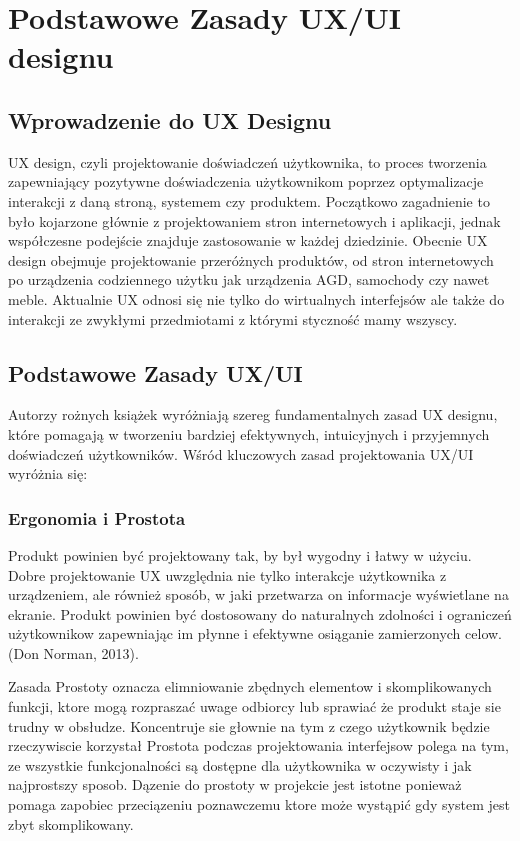 \chapter{Podstawowe Zasady UX/UI designu}

\section{Wprowadzenie do UX Designu}

 UX design, czyli projektowanie doświadczeń użytkownika, to proces tworzenia zapewniający pozytywne doświadczenia użytkownikom poprzez optymalizacje interakcji z daną stroną, systemem czy produktem. Początkowo zagadnienie to było kojarzone głównie z projektowaniem stron internetowych i aplikacji, jednak współczesne podejście znajduje zastosowanie w każdej dziedzinie. Obecnie UX design obejmuje projektowanie przeróżnych produktów, od stron internetowych po urządzenia codziennego użytku jak urządzenia AGD, samochody czy nawet meble. Aktualnie UX odnosi się nie tylko do wirtualnych interfejsów ale także do interakcji ze zwykłymi przedmiotami z którymi styczność mamy wszyscy.


\section{Podstawowe Zasady UX/UI}

Autorzy rożnych książek wyróżniają szereg fundamentalnych zasad UX designu, które pomagają w tworzeniu bardziej efektywnych, intuicyjnych i przyjemnych doświadczeń użytkowników.
Wśród kluczowych zasad projektowania UX/UI wyróżnia się:


\subsection{Ergonomia i Prostota}
Produkt powinien być projektowany tak, by był wygodny i łatwy w użyciu. Dobre projektowanie UX uwzględnia nie tylko interakcje użytkownika z urządzeniem, ale również sposób, w jaki przetwarza on informacje wyświetlane na ekranie. Produkt powinien być dostosowany do naturalnych zdolności i ograniczeń użytkownikow zapewniając im płynne i efektywne osiąganie zamierzonych celow.(Don Norman, 2013).

Zasada Prostoty oznacza elimniowanie zbędnych elementow i skomplikowanych funkcji, ktore mogą rozpraszać uwage odbiorcy lub sprawiać że produkt staje sie trudny w obsłudze. Koncentruje sie głownie na tym z czego użytkownik będzie rzeczywiscie korzystał Prostota podczas projektowania interfejsow polega na tym, ze wszystkie funkcjonalności są dostępne dla użytkownika w oczywisty i jak najprostszy sposob. Dązenie do prostoty w projekcie jest istotne ponieważ pomaga zapobiec przeciązeniu poznawczemu ktore może wystąpić gdy system jest zbyt skomplikowany. 


